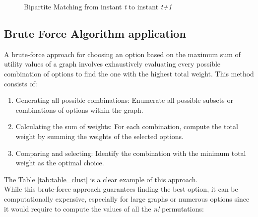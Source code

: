 \begin{figure}[H]
  \centering
  \caption{Bipartite Matching from instant \textit{t} to instant \textit{t+1}}
  \label{fig:clust_match}
\end{figure}


\subsection{Brute Force Algorithm application}
A brute-force approach for choosing an option based on the maximum sum of utility values of a graph involves exhaustively evaluating every possible combination of options to find the one with the highest total weight. 
This method consists of:
\begin{enumerate}
  \item Generating all possible combinations: Enumerate all possible subsets or combinations of options within the graph.
  \item Calculating the sum of weights: For each combination, compute the total weight by summing the weights of the selected options.
  \item Comparing and selecting: Identify the combination with the minimum total weight as the optimal choice.
\end{enumerate}
The Table \ref{tab:table_clust} is a clear example of this approach. \\   
While this brute-force approach guarantees finding the best option, it can be computationally expensive, especially for large graphs or numerous options since it would require to compute the values of all the \textit{n!} permutations:

